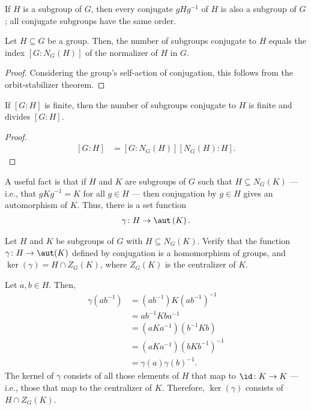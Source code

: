 \documentclass[10pt]{mypackage}
\begin{document}
If $H$ is a subgroup of $G$, then every conjugate $gHg^{-1}$ of $H$ is also a subgroup of $G$; all conjugate subgroups have the same order.
\begin{lemma}
  Let $H\subseteq G$ be a group. Then, the number of subgroups conjugate to $H$ equals the index $\left[ G:N_G(H) \right]$ of the normalizer of $H$ in $G$.
\end{lemma}
\begin{proof}
  Considering the group's self-action of conjugation, this follows from the orbit-stabilizer theorem.
\end{proof}
\begin{corollary}
  If $\left[ G:H \right]$ is finite, then the number of subgroups conjugate to $H$ is finite and divides $\left[ G:H \right]$.
\end{corollary}
\begin{proof}
  \begin{align*}
    \left[ G:H \right] &= \left[ G:N_G(H) \right]\left[ N_G(H):H \right].
  \end{align*}
\end{proof}
A useful fact is that if $H$ and $K$ are subgroups of $G$ such that $H\subseteq N_G(K)$ --- i.e., that $gKg^{-1} = K$ for all $g\in H$ --- then conjugation by $g\in H$ gives an automorphism of $K$. Thus, there is a set function
\begin{align*}
  \gamma\colon H\rightarrow \aut\left( K \right).
\end{align*}
\begin{exercise}
  Let $H$ and $K$ be subgroups of $G$ with $H\subseteq N_G(K)$. Verify that the function $\gamma\colon H\rightarrow \aut(K)$ defined by conjugation is a homomorphism of groups, and $\ker\left( \gamma \right) = H\cap Z_G(K)$, where $Z_G(K)$ is the centralizer of $K$.
\end{exercise}
\begin{solution}
  Let $a,b\in H$. Then,
  \begin{align*}
    \gamma\left( ab^{-1} \right) &= \left( ab^{-1} \right) K \left( ab^{-1} \right)^{-1}\\
                                 &= ab^{-1} K ba^{-1}\\
                                 &= \left( aKa^{-1} \right) \left( b^{-1}Kb \right)\\
                                 &= \left( aKa^{-1} \right)\left( bKb^{-1} \right)^{-1}\\
                                 &= \gamma\left( a \right)\gamma\left( b \right)^{-1}.
  \end{align*}
  The kernel of $\gamma$ consists of all those elements of $H$ that map to $\id\colon K\rightarrow K$ --- i.e., those that map to the centralizer of $K$. Therefore, $\ker\left( \gamma \right)$ consists of $H\cap Z_G(K)$.
\end{solution}
\end{document}
